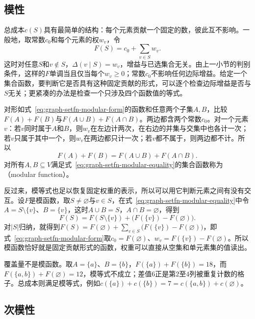 \subsection{模性}
\label{sec:graph-setfn-modularity}

总成本$c(S)$具有最简单的结构：每个元素贡献一个固定的数，彼此互不影响。一般地，取常数$c_0$和每个元素的权$w_v$，令
\begin{equation}
  F(S)=c_0+\sum_{v\in S}w_v .
  \label{eq:graph-setfn-modular-form}
\end{equation}
这时对任意$S$和$v\notin S$，$\Delta(v\mid S)=w_v$，增益与已选集合无关。由上一小节的判别条件，这样的$F$单调当且仅当每个$w_v\geq0$；常数$c_0$不影响任何边际增益。给定一个集合函数，要判断它是否具有这种固定贡献的形式，可以逐个检查边际增益是否与$S$无关；更紧凑的办法是检查一个只涉及四个函数值的等式。

对形如式~\eqref{eq:graph-setfn-modular-form}的函数和任意两个子集$A,B$，比较$F(A)+F(B)$与$F(A\cup B)+F(A\cap B)$。两边都含两个常数$c_0$。对一个元素$v$：若$v$同时属于$A$和$B$，则$w_v$在左边计两次，在右边的并集与交集中也各计一次；若$v$只属于其中一个，则$w_v$在两边都只计一次；若$v$都不属于，则两边都不计。所以
\begin{equation}
  F(A)+F(B)=F(A\cup B)+F(A\cap B).
  \label{eq:graph-setfn-modular-equality}
\end{equation}
对所有$A,B\subseteq V$满足式~\eqref{eq:graph-setfn-modular-equality}的集合函数称为（modular function）。

反过来，模等式也足以恢复固定权重的表示，所以可以用它判断元素之间有没有交互。设$F$是模函数，取$S\neq\varnothing$与$v\in S$，在式~\eqref{eq:graph-setfn-modular-equality}中令$A=S\setminus\{v\}$、$B=\{v\}$，这时$A\cup B=S$，$A\cap B=\varnothing$，得到
\[
  F(S)=F(S\setminus\{v\})+\bigl(F(\{v\})-F(\varnothing)\bigr).
\]
对$|S|$归纳，就得到$F(S)=F(\varnothing)+\sum_{v\in S}\bigl(F(\{v\})-F(\varnothing)\bigr)$，即式~\eqref{eq:graph-setfn-modular-form}取$c_0=F(\varnothing)$、$w_v=F(\{v\})-F(\varnothing)$。所以模函数恰好就是固定贡献形式的函数，权重可以直接从空集和单元素集的值读出。

覆盖量不是模函数。取$A=\{a\}$、$B=\{b\}$，$F(\{a\})+F(\{b\})=18$，而$F(\{a,b\})+F(\varnothing)=12$，模等式不成立；差值$6$正是第$2$至$4$列被重复计数的格子。总成本则满足模等式，例如$c(\{a\})+c(\{b\})=7=c(\{a,b\})+c(\varnothing)$。

\subsection{次模性}
\label{sec:graph-setfn-submodularity}

